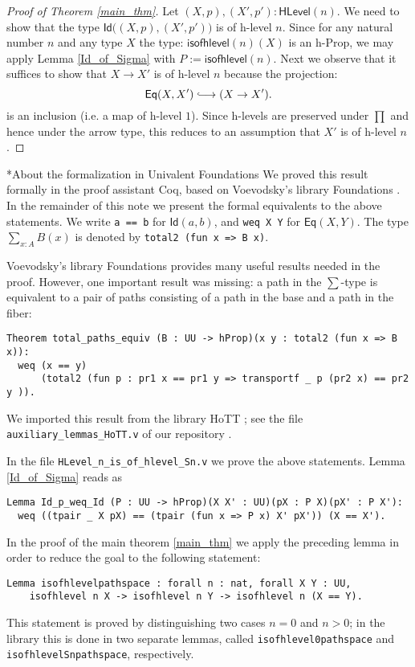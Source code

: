 \documentclass[11pt]{scrartcl}
\makeatletter
\theoremstyle{plain}
\theoremstyle{definition}
\newcommand{\Eq}{\mathsf{Eq}}
\newcommand{\HLevel}{\mathsf{HLevel}}
\newcommand{\Id}{\mathsf{Id}}
\newcommand{\isofhlevel}{\mathsf{isofhlevel}}
\newcommand{\oftype}{\! : \!}
\newcommand*{\into}{\ensuremath{\lhook\joinrel\relbar\joinrel\rightarrow}}
\renewcommand{\paragraph}{\@startsection{paragraph}{4}{0mm}{-0.5\baselineskip}{-1ex}{\bf}}
\makeatother
\begin{document}
\begin{proof}[Proof of Theorem \ref{main_thm}]
 Let $(X, p), (X', p') \oftype \HLevel(n)$. We need to show that the type $\Id \big( (X, p), (X', p')\big)$ is of h-level $n$. Since for any natural number $n$ and any type $X$ the type: $\isofhlevel(n)(X)$ is an h-Prop, we may apply Lemma \ref{Id_of_Sigma} with $P := \isofhlevel(n)$. Next we observe that it suffices to show that $X \rightarrow X'$ is of h-level $n$ because the projection:
 \[\Eq (X, X') \into (X \rightarrow X').\]
 is an inclusion (i.e. a map of h-level $1$). Since h-levels are preserved under $\prod$ and hence under the arrow type, this reduces to an assumption that $X'$ is of h-level $n$.
\end{proof}

\paragraph*{About the formalization in Univalent Foundations}
We proved this result formally in the proof assistant \textsf{Coq}, based on Voevodsky's
library \textsf{Foundations} \cite{voevodsky:univalent-foundations-coq}.
In the remainder of this note we present the formal equivalents to the above statements.
We write \lstinline!a == b! for $\Id(a, b)$, and \lstinline!weq X Y! for $\Eq(X, Y)$. The type $\sum\limits_{x : A} B(x)$ is denoted by
\lstinline!total2 (fun x => B x)!.

Voevodsky's library \textsf{Foundations} provides many useful results needed in the proof. However, one important
result was missing: a path in the $\sum$-type is equivalent to a pair of paths consisting of a path in the base and a path in the fiber:
\begin{lstlisting}
Theorem total_paths_equiv (B : UU -> hProp)(x y : total2 (fun x => B x)):
  weq (x == y)
      (total2 (fun p : pr1 x == pr1 y => transportf _ p (pr2 x) == pr2 y )).
\end{lstlisting}
We imported this result from the library \textsf{HoTT} \cite{hott:repo}; see the file
{\verb+auxiliary_lemmas_HoTT.v+} of our repository \cite{ahens-kapulkin:h-level-repo}.

In the file {\verb+HLevel_n_is_of_hlevel_Sn.v+} we prove the above statements.
Lemma \ref{Id_of_Sigma} reads as
\begin{lstlisting}
Lemma Id_p_weq_Id (P : UU -> hProp)(X X' : UU)(pX : P X)(pX' : P X'):
  weq ((tpair _ X pX) == (tpair (fun x => P x) X' pX')) (X == X').
\end{lstlisting}
In the proof of the main theorem \ref{main_thm} we apply the preceding lemma in order to
reduce the goal to the following statement:
\begin{lstlisting}
Lemma isofhlevelpathspace : forall n : nat, forall X Y : UU,
    isofhlevel n X -> isofhlevel n Y -> isofhlevel n (X == Y).
\end{lstlisting}
This statement is proved by distinguishing two cases $n = 0$ and $n > 0$; in the library this is done in
two separate lemmas, called \lstinline!isofhlevel0pathspace! and \lstinline!isofhlevelSnpathspace!,
respectively.
\end{document}
